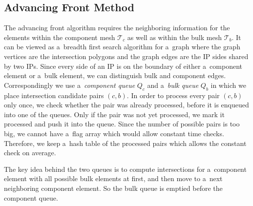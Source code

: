 \subsection{Advancing Front Method}
\label{sec:front}
The advancing front algorithm requires the neighboring information for the elements within the component mesh $\mathcal T_c$ 
as well as within the bulk mesh $\mathcal T_b$. It can be viewed as a~breadth first search algorithm for a~graph where the graph vertices are 
the intersection polygons and the graph edges are the IP sides shared by two IPs. Since every side of an IP is on the boundary of either 
a~component element or a~bulk element, we can distinguish bulk and component edges. 
Correspondingly we use a~\emph{component queue} $Q_c$ and a~\emph{bulk queue} $Q_b$ in which we place intersection candidate pairs $(c,b)$.
In order to process every pair $(c,b)$ only once, we check whether the pair was already processed, before it is enqueued into one of the queues.
Only if the pair was not yet processed, we mark it processed and push it into the queue.
Since the number of possible pairs is too big, we cannot have a~flag array
which would allow constant time checks. Therefore, we keep a~hash table of the processed pairs which allows the constant check on average.

The key idea behind the two queues is to compute intersections for a~component element with all possible bulk elements at first,
and then move to a~next neighboring component element. So the bulk queue is emptied before the component queue.
%   
%             
%   


